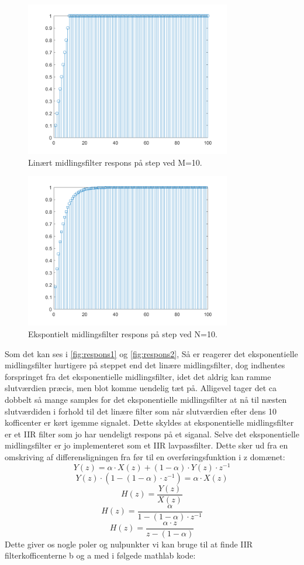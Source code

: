 \documentclass[12pt]{article}
\begin{document}
\begin{figure}[H]
	\centering
	\includegraphics[width=90mm]{Img/respons_alm.png}
	\caption{Linært midlingsfilter respons på step ved M=10.}
	\label{fig:respons1}
\end{figure}


\begin{figure}[H]
	\centering
	\includegraphics[width=90mm]{Img/respons_ex.png}
	\caption{Ekspontielt midlingsfilter respons på step ved N=10.}
	\label{fig:respons2}
\end{figure}
Som det kan ses i \autoref{fig:respons1} og \autoref{fig:respons2}, Så er reagerer det eksponentielle midlingsfilter hurtigere på steppet end det linære midlingsfilter, dog indhentes forspringet fra det eksponentielle midlingsfilter, idet det aldrig kan ramme slutværdien præcis, men blot komme uendelig tæt på. Alligevel tager det ca dobbelt så mange samples for det eksponentielle midlingsfilter at nå til næsten slutværdiden i forhold til det linære filter som når slutværdien efter dens 10 kofficenter er kørt igemme signalet. Dette skyldes at eksponentielle midlingsfilter er et IIR filter som jo har uendeligt respons på et siganal.
\newline
Selve det eksponentielle midlingsfilter er jo  implementeret som et IIR lavpassfilter. Dette sker ud fra en omskriving af differensligningen fra før til en overføringsfunktion i z domænet:
\[ Y(z)=\alpha \cdot X(z)+(1-\alpha)\cdot Y(z) \cdot z^{-1}\]
\[ Y(z)\cdot (1-(1-\alpha)\cdot z^{-1})=\alpha \cdot X(z)\]
\[H(z)=\dfrac{Y(z)}{X(z)}\]
\[H(z)=\dfrac{\alpha}{1-(1-\alpha)\cdot z^{-1}}\]
\[H(z)=\dfrac{\alpha \cdot z}{z-(1-\alpha)}\]
\newline
Dette giver os nogle poler og nulpunkter vi kan bruge til at finde IIR filterkofficenterne b og a med i følgede mathlab kode:
\end{document}
